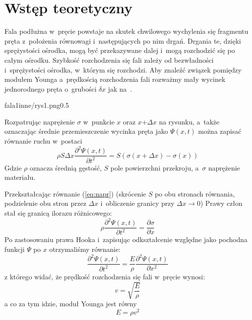 \documentclass{fizraport}
\begin{document}
\maketitle

\section{Wstęp teoretyczny}
    Fala podłużna w~pręcie powstaje na skutek chwilowego wychylenia się
    fragmentu pręta z~położenia równowagi i~następujących po nim drgań.
    Drgania te, dzięki sprężystości ośrodka, mogą być przekazywane dalej i~mogą
    rozchodzić się po całym ośrodku. Szybkość rozchodzenia się fali zależy
    od bezwładności i~sprężystości ośrodka, w~którym się rozchodzi.
    Aby znaleźć związek pomiędzy modułem Younga a~prędkością rozchodzenia
    fali rozważmy mały wycinek jednorodnego pręta o~grubości $\delta x$ jak na~.
    
    {fala1}{inne/rys1.png}{0.5\textwidth}
    
    
    Rozpatrując naprężenie $\sigma$ w~punkcie $x$ oraz $x$+$\Delta{x}$ na rysunku, a~także oznaczając średnie przemieszczenie wycinka pręta jako $\Psi(x,t)$ można zapisać równanie ruchu w~postaci
    \begin{equation}
    \label{eq:napr}
    \rho S \Delta{x}\frac{\partial^2\Psi(x,t)}{\partial t^2} = S(\sigma(x+\Delta{x})-\sigma(x))
    \end{equation}
    Gdzie $\rho$ oznacza średnią gęstość, $S$ pole powierzchni przekroju, a~$\sigma$
    naprężenie materiału.
    \pagebreak
    
    Przekształcając równanie (\ref{eq:napr}) (skrócenie $S$ po obu stronach równania,
    podzielenie obu stron przez $\Delta{x}$ i~obliczenie granicy przy $\Delta{x}\rightarrow0$) Prawy człon stał się granicą ilorazu różnicowego:
    \begin{equation*}
        \rho\frac{\partial^2\Psi(x,t)}{\partial t^2} = \frac{\partial\sigma}{\partial x}
    \end{equation*}
    Po zastosowaniu prawa Hooka i~zapisując odkształcenie względne jako pochodna funkcji $\Psi$ po $x$ otrzymaliśmy równanie:
    \begin{equation*}
        \frac{\partial^2\Psi(x,t)}{\partial t^2} = \frac{E}{\rho}\frac{\partial^2\Psi(x,t)}{\partial x^2}
    \end{equation*}
%
    z którego widać, że prędkość rozchodzenia się fali w~pręcie wynosi:
    \begin{equation*}
        v = \sqrt{\frac{E}{\rho}}
    \end{equation*}
%
    a co za tym idzie, moduł Younga jest równy \[E = \rho v^2\]
\end{document}
